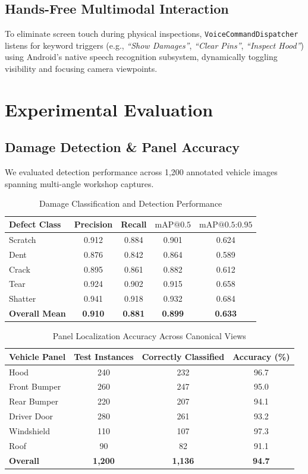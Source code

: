 \documentclass[10pt,journal,compsoc]{IEEEtran}
\begin{document}
\subsection{Hands-Free Multimodal Interaction}
To eliminate screen touch during physical inspections, \texttt{VoiceCommandDispatcher} listens for keyword triggers (e.g., \textit{``Show Damages''}, \textit{``Clear Pins''}, \textit{``Inspect Hood''}) using Android's native speech recognition subsystem, dynamically toggling visibility and focusing camera viewpoints.

\section{Experimental Evaluation}

\subsection{Damage Detection & Panel Accuracy}
We evaluated detection performance across 1,200 annotated vehicle images spanning multi-angle workshop captures. 

\begin{table}[h]
\centering
\caption{Damage Classification and Detection Performance}
\label{tab:damage_results}
\begin{tabular}{@{}lcccc@{}}
\toprule
\textbf{Defect Class} & \textbf{Precision} & \textbf{Recall} & \textbf{$\text{mAP}@0.5$} & \textbf{$\text{mAP}@0.5\text{:}0.95$} \\
\midrule
Scratch & 0.912 & 0.884 & 0.901 & 0.624 \\
Dent & 0.876 & 0.842 & 0.864 & 0.589 \\
Crack & 0.895 & 0.861 & 0.882 & 0.612 \\
Tear & 0.924 & 0.902 & 0.915 & 0.658 \\
Shatter & 0.941 & 0.918 & 0.932 & 0.684 \\
\midrule
\textbf{Overall Mean} & \textbf{0.910} & \textbf{0.881} & \textbf{0.899} & \textbf{0.633} \\
\bottomrule
\end{tabular}
\end{table}

\begin{table}[h]
\centering
\caption{Panel Localization Accuracy Across Canonical Views}
\label{tab:panel_acc}
\begin{tabular}{@{}lccc@{}}
\toprule
\textbf{Vehicle Panel} & \textbf{Test Instances} & \textbf{Correctly Classified} & \textbf{Accuracy (\%)} \\
\midrule
Hood & 240 & 232 & 96.7 \\
Front Bumper & 260 & 247 & 95.0 \\
Rear Bumper & 220 & 207 & 94.1 \\
Driver Door & 280 & 261 & 93.2 \\
Windshield & 110 & 107 & 97.3 \\
Roof & 90 & 82 & 91.1 \\
\midrule
\textbf{Overall} & \textbf{1,200} & \textbf{1,136} & \textbf{94.7} \\
\bottomrule
\end{tabular}
\end{table}
\end{document}
